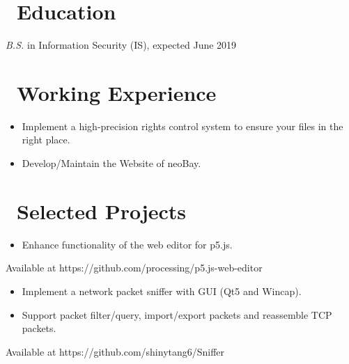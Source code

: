 \documentclass{resume}
\begin{document}



\section{\faGraduationCap\ Education}
\textit{B.S.} in Information Security (IS), expected June 2019

\section{\faBuilding\ Working Experience}

\begin{itemize}
  \item Implement a high-precision rights control system to ensure your files in the right place.
  \item Develop/Maintain the Website of neoBay.
\end{itemize}

\section{\faUsers\ Selected Projects}

\begin{itemize}
  \item Enhance functionality of the web editor for p5.js.
\end{itemize}
Available at https://github.com/processing/p5.js-web-editor


\begin{itemize}
  \item Implement a network packet sniffer with GUI (Qt5 and Wincap).
  \item Support packet filter/query, import/export packets and reassemble TCP packets.
\end{itemize}
Available at https://github.com/shinytang6/Sniffer
\end{document}
